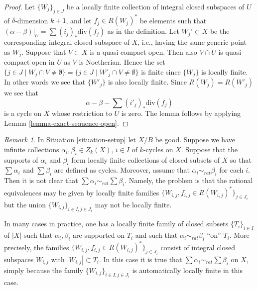 \documentclass{stacks-project}
\theoremstyle{plain}
\theoremstyle{definition}
\theoremstyle{remark}
\newtheorem{remark}[subsection]{Remark}
\numberwithin{equation}{subsection}
\begin{document}
\begin{proof}
Let $\{W_j\}_{j \in J}$ be a locally finite collection of integral closed
subspaces of $U$ of $\delta$-dimension $k + 1$, and let $f_j \in R(W_j)^*$
be elements such that $(\alpha - \beta)|_U = \sum (i_j)_*\text{div}(f_j)$
as in the definition. Let $W_j' \subset X$ be the corresponding integral
closed subspace of $X$, i.e., having the same generic point as $W_j$.
Suppose that $V \subset X$ is a quasi-compact open.
Then also $V \cap U$ is quasi-compact open in $U$ as $V$ is Noetherian.
Hence the set $\{j \in J \mid W_j \cap V \not = \emptyset\}
= \{j \in J \mid W'_j \cap V \not = \emptyset\}$
is finite since $\{W_j\}$ is locally finite. In other words we see that
$\{W'_j\}$ is also locally finite. Since $R(W_j) = R(W'_j)$ we see
that
$$
\alpha - \beta - \sum (i'_j)_*\text{div}(f_j)
$$
is a cycle on $X$ whose restriction to $U$ is zero.
The lemma follows by applying Lemma \ref{lemma-exact-sequence-open}.
\end{proof}

\begin{remark}
\label{remark-infinite-sums-rational-equivalences}
In Situation \ref{situation-setup} let $X/B$ be good.
Suppose we have infinite collections $\alpha_i, \beta_i \in Z_k(X)$,
$i \in I$ of $k$-cycles on $X$. Suppose that the supports
of $\alpha_i$ and $\beta_i$ form locally finite collections
of closed subsets of $X$ so that $\sum \alpha_i$
and $\sum \beta_i$ are defined as cycles. Moreover, assume that
$\alpha_i \sim_{rat} \beta_i$ for each $i$. Then it is not
clear that $\sum \alpha_i \sim_{rat} \sum \beta_i$. Namely,
the problem is that the rational equivalences may be
given by locally finite
families $\{W_{i, j}, f_{i, j} \in R(W_{i, j})^*\}_{j \in J_i}$
but the union $\{W_{i, j}\}_{i \in I, j\in J_i}$ may not
be locally finite.

\medskip\noindent
In many cases in practice, one has a locally finite family of closed
subsets $\{T_i\}_{i \in I}$ of $|X|$ such that $\alpha_i, \beta_i$
are supported on $T_i$ and such that $\alpha_i \sim_{rat} \beta_i$
``on'' $T_i$. More precisely, the families
$\{W_{i, j}, f_{i, j} \in R(W_{i, j})^*\}_{j \in J_i}$
consist of integral closed subspaces $W_{i, j}$
with $|W_{i, j}| \subset T_i$. In this case it is true that
$\sum \alpha_i \sim_{rat} \sum \beta_i$ on $X$, simply because
the family $\{W_{i, j}\}_{i \in I, j\in J_i}$ is automatically
locally finite in this case.
\end{remark}
\end{document}
